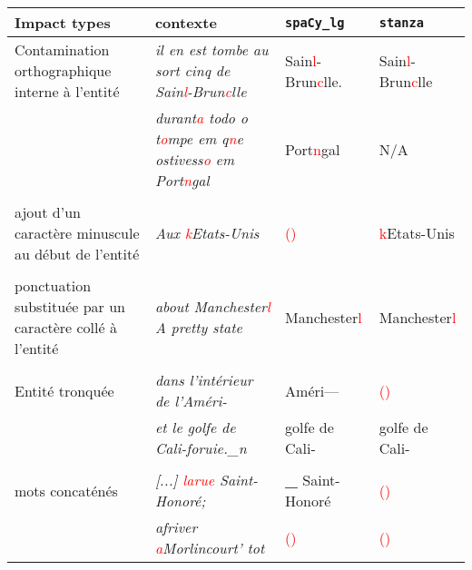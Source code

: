 \footnotesize{\begin{tabular}{|p{3.2cm}|p{4cm}|p{1.5cm}|p{1.3cm}|}

\hline


\bf{Impact types} & \bf {contexte} &  \bf{\texttt{spaCy\_lg}}&\bf{\texttt{stanza}}\\
\hline
 Contamination orthographique interne à l'entité& 
\textit{il en est tombe au sort cinq de Sain\textcolor{red}{l}-Brun\textcolor{red}{c}lle} & Sain\textcolor{red}{l}-Brun\textcolor{red}{c}lle. & Sain\textcolor{red}{l}-Brun\textcolor{red}{c}lle \\

&\textit{durant\textcolor{red}{a} todo o t\textcolor{red}{o}mpe
em q\textcolor{red}{n}e ostivess\textcolor{red}{o} em Port\textcolor{red}{n}gal}& Port\textcolor{red}{n}gal & N/A\\ 
&&  & \\
\rowcolor{lightgray}ajout d'un caractère minuscule au début de l'entité &\textit{Aux \textcolor{red}{k}Etats-Unis}& \textcolor{red}{()} & \textcolor{red}{k}Etats-Unis\\
&&  & \\
ponctuation substituée par un caractère collé à l'entité &\textit{about Manchester\textcolor{red}{l} A
pretty state}&Manchester\textcolor{red}{l}&Manchester\textcolor{red}{l}\\
&&  & \\
\rowcolor{lightgray}Entité tronquée &\textit{dans l'intérieur de l'Améri-} & Améri—& \textcolor{red}{()}\\
\rowcolor{lightgray}&\textit{et le golfe de Cali-foruie.\_n}&golfe de Cali-& golfe de Cali-\\
&&  & \\
mots concaténés & \textit{[...] \textcolor{red}{larue} Saint-Honoré;}& \textbf{\_} Saint-Honoré &  \textcolor{red}{()} \\
&\textit{afriver \textcolor{red}{a}Morlincourt' tot}& \textcolor{red}{()} & \textcolor{red}{()}\\



\hline
\end{tabular}}